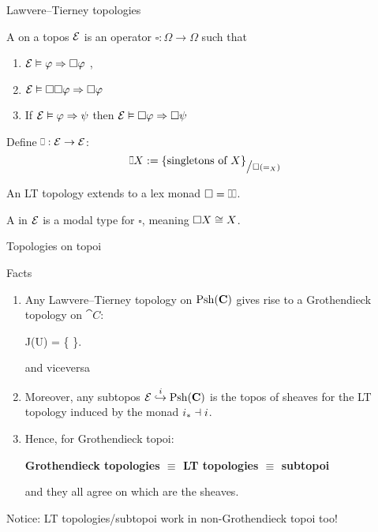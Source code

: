 \begin{frame}{Lawvere--Tierney topologies}
	\begin{definition}
		A  on a topos $\mathcal{E}$ is an operator $\square : \Omega \to \Omega$ such that
		\begin{enumerate}
			\item $\mathcal{E} \vDash \varphi \Rightarrow \square \varphi$ ,
			\item $\mathcal{E} \vDash \square \square \varphi \Rightarrow \square \varphi$ 
			\item If $\mathcal{E} \vDash \varphi \Rightarrow \psi$ then $\mathcal{E} \vDash \square \varphi \Rightarrow \square \psi$ 
		\end{enumerate}
	\end{definition}
	Define $\halfsquare : \topos E \to \topos E$:
	\begin{equation*}
		\halfsquare X := \{ \text{singletons of $X$} \}_{\big/ \square (=_X)}
	\end{equation*}
	\vspace{-5.5ex}
	\begin{proposition}
		An LT topology extends to a lex monad $\square = \halfsquare \halfsquare$.
	\end{proposition}
	\begin{definition}
		A  in $\mathcal{E}$ is a modal type for $\square$, meaning $\square X \overset{}{\cong} X$.
	\end{definition}
\end{frame}

\begin{frame}{Topologies on topoi}
	\begin{block}{Facts}
		\begin{enumerate}
			\item Any Lawvere--Tierney topology on $\operatorname{Psh}(\mathbf{C})$ gives rise to a Grothendieck topology on $\cat C$:
			\begin{eqalign*}
				J(U) = \{  \suchthat {}\}.
			\end{eqalign*}
			and viceversa
			\item Moreover, any subtopos $\mathcal{E} \overset{i}{\hookrightarrow} \operatorname{Psh} (\mathbf{C})$ is the topos of sheaves for the LT topology induced by the monad $i_* \dashv i$.
			\item Hence, for Grothendieck topoi:
			\begin{center}
			\bfseries
				Grothendieck topologies $\equiv$ LT topologies $\equiv$ subtopoi
			\end{center}
			and they all agree on which are the sheaves.
		\end{enumerate}
	\end{block}
	Notice: LT topologies/subtopoi work in non-Grothendieck topoi too!
\end{frame}

